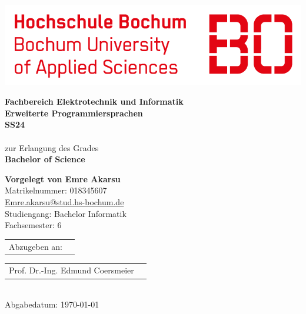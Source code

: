 \setlength\parindent{0cm}


\begin{titlepage}	
\includegraphics[scale = 0.6]{HSBochum-logo.png}

\vspace{2cm}
{
\begin{center}
\LARGE\textbf{Fachbereich Elektrotechnik und Informatik}\\
\vspace{0.3cm}
\textbf{Erweiterte Programmiersprachen}\\
\vspace{0.3cm}
\textbf{SS24}\\
\vspace{1cm}
\LARGE\textit{\grqq }\\
\vspace{1cm}
\large{zur Erlangung des Grades\\}
\textbf{Bachelor of Science}
\end{center}
}

\vspace{3cm}
{
\large\textbf{Vorgelegt von Emre Akarsu\\}
\normalsize{Matrikelnummer: 018345607}\\
\href{mailto: emre.akarsu@stud.hs-bochum.de}{Emre.akarsu@stud.hs-bochum.de} 
\\
Studiengang: Bachelor Informatik\\
Fachsemester: 6
}

\vspace{3cm}
{
\begin{tabular}{@{}ll}
Abzugeben an:
\end{tabular}
\begin{tabular}{@{}ll}
Prof. Dr.-Ing. Edmund Coersmeier
\end{tabular}
}
\\Abgabedatum: \today
\end{titlepage}


